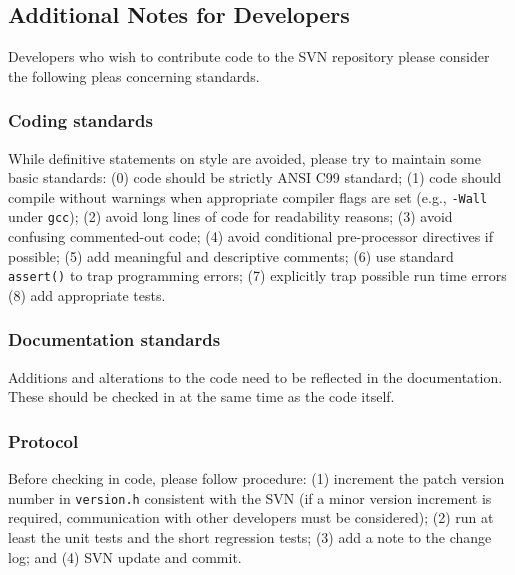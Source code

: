 \subsection{Additional Notes for Developers}
\label{xref:developers}

Developers who wish to contribute code to the SVN repository
please consider the following pleas concerning standards.

\subsubsection{Coding standards}

While definitive statements on style are avoided, please try to
maintain some basic standards: (0) code should be strictly ANSI C99
standard; (1) code should compile without warnings when appropriate
compiler flags are set (e.g., \texttt{-Wall} under \texttt{gcc});
(2) avoid long lines of code for readability reasons;
(3) avoid confusing commented-out code; (4) avoid conditional pre-processor
directives if possible; (5) add meaningful and descriptive comments;
(6) use standard \texttt{assert()} to trap programming errors;
(7) explicitly trap possible run time errors (8) add appropriate
tests.

\subsubsection{Documentation standards}

Additions and alterations to the code need to be reflected in the
documentation. These should be checked in at the same time as the
code itself.

\subsubsection{Protocol}

Before checking in code, please follow procedure: (1) increment the
patch version number in \texttt{version.h} consistent with the SVN
(if a minor version increment is required, communication with
other developers must be considered); (2) run at least the unit
tests and the short regression tests; (3) add a note to the change
log; and (4) SVN update and commit.

\vfill
\pagebreak

